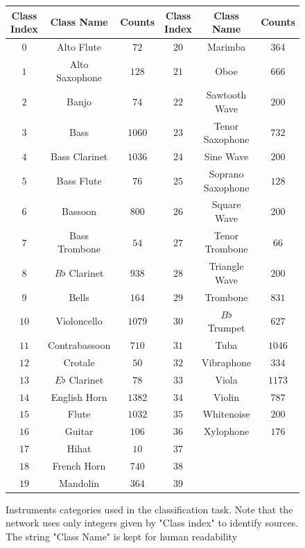 \documentclass[12pt,letterpaper]{article}
\begin{document}
\begin{figure}[H]
\begin{center}
\begin{tabular}{||c|c|c| |c|c|c||}
\hline
\textbf{Class Index} & \textbf{Class Name} & \textbf{Counts} & \textbf{Class Index} & \textbf{Class Name} & \textbf{Counts} \\
\hline \hline
$0$ & Alto Flute & $72$ 			& $20$ & Marimba & $364$ \\ \hline
$1$ & Alto Saxophone & $128$ 		& $21$ & Oboe & $666$  \\ \hline
$2$ & Banjo & $74$ 					& $22$ & Sawtooth Wave & $200$ \\ \hline
$3$ & Bass & $1060$ 				& $23$ & Tenor Saxophone & $732$ \\ \hline
$4$ & Bass Clarinet & $1036$ 		& $24$ & Sine Wave & $200$ \\ \hline

$5$ & Bass Flute & $76$ 			& $25$ & Soprano Saxophone & $128$\\ \hline
$6$ & Bassoon & $800$ 				& $26$ & Square Wave & $200$ \\ \hline
$7$ & Bass Trombone & $54$ 			& $27$ & Tenor Trombone & $66$ \\ \hline
$8$ & $B\flat$ Clarinet & $938$ 	& $28$ & Triangle Wave & $200$ \\ \hline
$9$ & Bells & $164$ 				& $29$ & Trombone & $831$ \\ \hline

$10$ & Violoncello & $1079$ 		& $30$ & $B\flat$ Trumpet & $627$ \\ \hline
$11$ & Contrabassoon & $710$ 		& $31$ & Tuba & $1046$ \\ \hline
$12$ & Crotale & $50$ 				& $32$ & Vibraphone & $334$ \\ \hline
$13$ & $E\flat$ Clarinet & $78$ 	& $33$ & Viola & $1173$ \\ \hline
$14$ & English Horn & $1382$ 		& $34$ & Violin & $787$ \\ \hline

$15$ & Flute & $1032$ 				& $35$ & Whitenoise & $200$ \\ \hline
$16$ & Guitar & $106$ 				& $36$ & Xylophone & $176$ \\ \hline
$17$ & Hihat & $10$ 				& $37$ & & \\ \hline
$18$ & French Horn & $740$ 			& $38$ & & \\ \hline
$19$ & Mandolin & $364$ 			& $39$ & & \\ \hline

\end{tabular}
\end{center}
\caption{Instruments categories used in the classification task. Note that the network uses only integers given by "Class index" to identify sources. The string "Class Name" is kept for human readability}
\label{fig-ClassList}
\end{figure}
\end{document}
